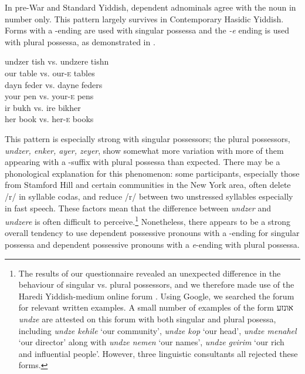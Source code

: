 \documentclass[output=paper, hidelinks]{langscibook}
\begin{document}

In pre-War and Standard Yiddish, dependent adnominals agree with the noun in number only. This pattern largely survives in Contemporary Hasidic Yiddish. Forms with a \varnothing-ending are used with singular possessa and the \textit{-e} ending is used with plural possessa, as demonstrated in .

\ea\label{ex:10} \ea \gll undzer tish vs. undzere tishn \\
our table vs. our-\textsc{e} tables \\
\ex \gll dayn feder vs. dayne feders\\
your pen vs. your-\textsc{e} pens\\
\ex \gll ir bukh vs. ire bikher \\
her book vs. her-\textsc{e} books\\
\z
\z

This pattern is especially strong with singular possessors; the plural possessors, \textit{undzer, enker, ayer, zeyer}, show somewhat more variation with more of them appearing with a \varnothing-suffix with plural possessa than expected. There may be a phonological explanation for this phenomenon: some participants, especially those from Stamford Hill and certain communities in the New York area, often delete /r/ in syllable codas, and reduce /r/ between two unstressed syllables especially in fast speech. These factors mean that the difference between \textit{undzer} and \textit{undzere} is often difficult to perceive.\footnote{The results of our questionnaire revealed an unexpected difference in the behaviour of singular vs. plural possessors, and we therefore made use of the Haredi Yiddish-medium online forum \citet{KaveShtiebel}. Using Google, we searched the forum for relevant written examples. A small number of examples of the form אונזע \textit{undze} are attested on this forum with both singular and plural posessa, including \textit{undze kehile} `our community', \textit{undze kop} `our head', \textit{undze menahel} `our director' along with \textit{undze nemen} `our names', \textit{undze gvirim} `our rich and influential people'. However, three linguistic consultants all rejected these forms.} Nonetheless, there appears to be a strong overall tendency to use dependent possessive pronouns with a \varnothing-ending for singular possessa and dependent possessive pronouns with a \textit{e}-ending with plural possessa. 
\end{document}
